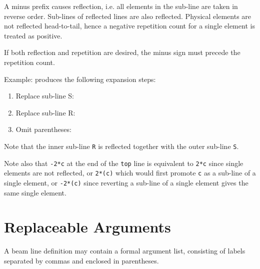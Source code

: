 A minus prefix causes reflection, i.e. all elements in the sub-line are
taken in reverse order. Sub-lines of reflected lines are also reflected.
Physical elements are not reflected head-to-tail, hence a negative
repetition count for a single element is treated as positive. 

If both reflection and repetition are desired, the minus sign must
precede the repetition count.  

Example: 
produces the following expansion steps:
\begin{enumerate}
  \item Replace sub-line S: 
  \item Replace sub-line R: 
  \item Omit parentheses: 
\end{enumerate}

Note that the inner sub-line \texttt{R} is reflected together with the
outer sub-line \texttt{S}.

Note also that \texttt{-2*c} at the end of the \texttt{top} line is
equivalent to \texttt{2*c} since single elements are not reflected, or
\texttt{2*(c)} which would first promote \texttt{c} as a sub-line of a
single element, or \texttt{-2*(c)} since reverting a sub-line of a
single element gives the same single element.  

 


\section{Replaceable Arguments}
\label{sec:repl_args}

A beam line definition may contain a formal argument list, consisting of
labels separated by commas and enclosed in parentheses. 

